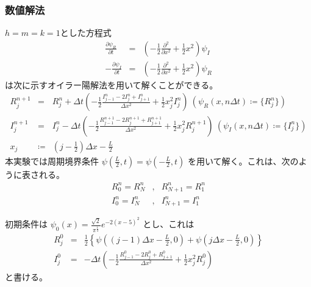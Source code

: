 \documentclass[a4j, titlepage]{jsarticle}
\numberwithin{equation}{section}
\begin{document}
        \subsubsection{数値解法}
            $h=m=k=1$とした方程式
            \begin{eqnarray*}
                \frac{\partial\psi_R}{\partial t} &=& \left(-\frac{1}{2}\frac{\partial^2}{\partial x^2} + \frac{1}{2}x^2\right)\psi_I \\
                -\frac{\partial\psi_I}{\partial t} &=& \left(-\frac{1}{2}\frac{\partial^2}{\partial x^2} + \frac{1}{2}x^2\right)\psi_R
            \end{eqnarray*}
            は次に示すオイラー陽解法を用いて解くことができる。
            \begin{eqnarray*}
                R_j^{n+1} &=& R_j^n + \Delta t\left(-\frac{1}{2}\frac{I_{j-1}^n-2I_j^n+I_{j+1}^n}{\Delta x^2}+\frac{1}{2}x_j^2I_j^n\right) \ \left(\psi_R(x, n\Delta t) \coloneqq \{R_j^n\}\right) \\
                I_j^{n+1} &=& I_j^n - \Delta t\left(-\frac{1}{2}\frac{R_{j-1}^{n+1}-2R_j^{n+1}+R_{j+1}^{n+1}}{\Delta x^2}+\frac{1}{2}x_j^2R_j^{n+1}\right) \ \left(\psi_I(x, n\Delta t) \coloneqq \{I_j^n\}\right) \\
                x_j &\coloneqq& \left(j - \frac{1}{2}\right)\Delta x - \frac{L}{2}
            \end{eqnarray*}
            本実験では周期境界条件
            $\displaystyle\psi\left(\frac{L}{2}, t\right) = \psi\left(-\frac{L}{2}, t\right)$
            を用いて解く。これは、次のように表される。
            \begin{eqnarray*}
                R_0^n = R_N^n&,& R_{N+1}^n = R_1^n \\
                I_0^n = I_N^n&,& I_{N+1}^n = I_1^n
            \end{eqnarray*}

            初期条件は
            $\displaystyle\psi_0(x)=\frac{\sqrt{2}}{\pi^\frac{1}{4}}e^{-2(x-5)^2}$
            とし、これは
            \begin{eqnarray*}
                R_j^0 &=& \frac{1}{2}\left\{\psi\left((j-1)\Delta x-\frac{L}{2}, 0\right) + \psi\left(j\Delta x-\frac{L}{2}, 0\right)\right\} \\
                I_j^0 &=& -\Delta t\left(-\frac{1}{2}\frac{R_{j-1}^0 - 2R_j^0 + R_{j+1}^0}{\Delta x^2} + \frac{1}{2}x_j^2R_j^0\right)
            \end{eqnarray*}
            と書ける。
        
\end{document}

